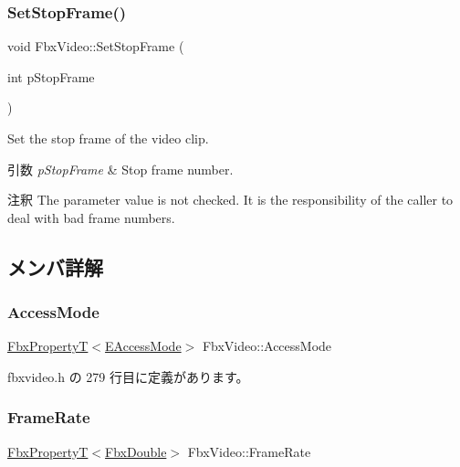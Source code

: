 \subsubsection{\texorpdfstring{Set\+Stop\+Frame()}{SetStopFrame()}}
{\footnotesize\ttfamily void Fbx\+Video\+::\+Set\+Stop\+Frame (\begin{DoxyParamCaption}\item[{int}]{p\+Stop\+Frame }\end{DoxyParamCaption})}

Set the stop frame of the video clip. 
\begin{DoxyParams}{引数}
{\em p\+Stop\+Frame} & Stop frame number. \\
\hline
\end{DoxyParams}
\begin{DoxyRemark}{注釈}
The parameter value is not checked. It is the responsibility of the caller to deal with bad frame numbers. 
\end{DoxyRemark}


\subsection{メンバ詳解}
\mbox{\label{class_fbx_video_a23a5a08b0504da545d812c16a7a0d20a}} 
\subsubsection{\texorpdfstring{Access\+Mode}{AccessMode}}
{\footnotesize\ttfamily \hyperlink{class_fbx_property_t}{Fbx\+PropertyT}$<$\hyperlink{class_fbx_video_a6dd88dabb2170adcd8c58952ed2e0c40}{E\+Access\+Mode}$>$ Fbx\+Video\+::\+Access\+Mode}



 fbxvideo.\+h の 279 行目に定義があります。

\mbox{\label{class_fbx_video_ac97913b5255c4f67ec2d401d8ff2b619}} 
\subsubsection{\texorpdfstring{Frame\+Rate}{FrameRate}}
{\footnotesize\ttfamily \hyperlink{class_fbx_property_t}{Fbx\+PropertyT}$<$\hyperlink{fbxtypes_8h_a171e72a1c46fc15c1a6c9c31948c1c5b}{Fbx\+Double}$>$ Fbx\+Video\+::\+Frame\+Rate}



